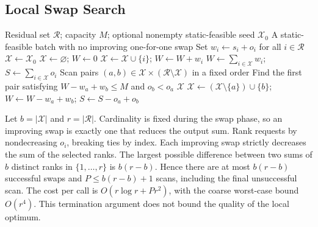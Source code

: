 \documentclass[nonblindrev]{informs3_hide}
\begin{document}
\subsection{Local Swap Search}
\begin{algorithm}[htbp]
\caption{Local Swap Search, optionally from a supplied feasible seed}
\label{alg:local_swap}
\begin{algorithmic}[1]
\Require Residual set $\mathcal R$; capacity $M$; optional nonempty static-feasible seed $\mathcal X_0$
\Ensure A static-feasible batch with no improving one-for-one swap
\State Set $w_i\gets s_i+o_i$ for all $i\in\mathcal R$
  \State $\mathcal X\gets\mathcal X_0$
\Else
  \State $\mathcal X\gets\varnothing$; $W\gets0$
      \State $\mathcal X\gets\mathcal X\cup\{i\}$; $W\gets W+w_i$
    \EndIf
  \EndFor
\EndIf
\State $W\gets\sum_{i\in\mathcal X}w_i$; $S\gets\sum_{i\in\mathcal X}o_i$
\Loop
  \State Scan pairs $(a,b)\in\mathcal X\times(\mathcal R\setminus\mathcal X)$ in a fixed order
  \State Find the first pair satisfying $W-w_a+w_b\le M$ and $o_b<o_a$
    \State \Return $\mathcal X$
  \EndIf
  \State $\mathcal X\gets(\mathcal X\setminus\{a\})\cup\{b\}$; $W\gets W-w_a+w_b$; $S\gets S-o_a+o_b$
\EndLoop
\end{algorithmic}
\end{algorithm}

Let $b=|\mathcal X|$ and $r=|\mathcal R|$. Cardinality is
fixed during the swap phase, so an improving swap is exactly one that
reduces the output sum. Rank requests by nondecreasing $o_i$, breaking
ties by index. Each improving swap strictly decreases the sum of the
selected ranks. The largest possible difference between two sums of $b$
distinct ranks in $\{1,\ldots,r\}$ is $b(r-b)$. Hence there are at most
$b(r-b)$ successful swaps and $P\le b(r-b)+1$ scans, including the final
unsuccessful scan. The cost per call is $O(r\log r+Pr^2)$, with the coarse
worst-case bound $O(r^4)$. This termination argument does not bound the
quality of the local optimum.
\end{document}

